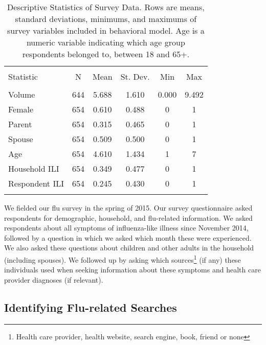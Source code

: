\documentclass[fleqn,10pt]{wlscirep}
\begin{document}
\begin{table}[!htbp] \centering 
  \label{tab: Descriptives} 
\begin{tabular}{@{\extracolsep{5pt}}lccccc} 
\\[-1.8ex]\hline 
\hline \\[-1.8ex] 
Statistic & \multicolumn{1}{c}{N} & \multicolumn{1}{c}{Mean} & \multicolumn{1}{c}{St. Dev.} & \multicolumn{1}{c}{Min} & \multicolumn{1}{c}{Max} \\ 
\hline \\[-1.8ex] 
Volume & 644 & 5.688 & 1.610 & 0.000 & 9.492 \\ 
Female & 654 & 0.610 & 0.488 & 0 & 1 \\ 
Parent & 654 & 0.315 & 0.465 & 0 & 1 \\ 
Spouse & 654 & 0.509 & 0.500 & 0 & 1 \\ 
Age & 654 & 4.610 & 1.434 & 1 & 7 \\ 
Household ILI & 654 & 0.349 & 0.477 & 0 & 1 \\ 
Respondent ILI & 654 & 0.245 & 0.430 & 0 & 1 \\ 
\hline \\[-1.8ex] 
\end{tabular} 
  \caption{Descriptive Statistics of Survey Data. Rows are means, standard deviations, minimums, and maximums of survey variables included in behavioral model. Age is a numeric variable indicating which age group respondents belonged to, between 18 and 65+.} 
\end{table} 

We fielded our flu survey in the spring of 2015. Our survey questionnaire asked respondents for demographic, household, and flu-related information. We asked respondents about all symptoms of influenza-like illness since November 2014, followed by a question in which we asked which month these were experienced. We also asked these questions about children and other adults in the household (including spouses). We followed up by asking which sources\footnote{Health care provider, health website, search engine, book, friend or none} (if any) these individuals used when seeking information about these symptoms and health care provider diagnoses (if relevant).

\subsection*{Identifying Flu-related Searches}
\end{document}
